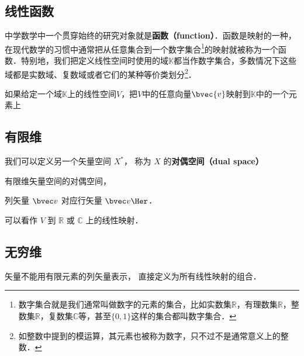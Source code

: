 

\subsection{线性函数}

中学数学中一个贯穿始终的研究对象就是\textbf{函数（function）}．函数是映射的一种，在现代数学的习惯中通常把从任意集合到一个数字集合\footnote{数字集合就是我们通常叫做数字的元素的集合，比如实数集$\mathbb{R}$，有理数集$\mathbb{R}$，整数集$\mathbb{R}$，复数集$\mathbb{C}$等，甚至$\{0, 1\}$这样的集合都叫数字集合．}的映射就被称为一个函数．特别地，我们把定义线性空间时使用的域$\mathbb{K}$都当作数字集合，多数情况下这些域都是实数域、复数域或者它们的某种等价类划分\footnote{如整数中提到的模运算，其元素也被称为数字，只不过不是通常意义上的整数．}．

如果给定一个域$\mathbb{K}$上的线性空间$V$，把$V$中的任意向量$\bvec{v}$映射到$\mathbb{K}$中的一个元素上











\subsection{有限维}
我们可以定义另一个矢量空间 $X^*$， 称为 $X$ 的\textbf{对偶空间（dual space）}

有限维矢量空间的对偶空间， 

列矢量 $\bvec v$ 对应行矢量 $\bvec v\Her$．

可以看作 $V$ 到 $\mathbb R$ 或 $\mathbb C$ 上的线性映射．

\subsection{无穷维}
矢量不能用有限元素的列矢量表示， 直接定义为所有线性映射的组合．
